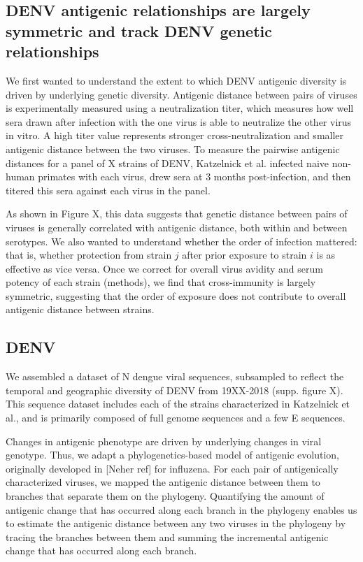 \documentclass[11pt,oneside,letterpaper]{article}
\begin{document}
\subsection*{DENV antigenic relationships are largely symmetric and track DENV genetic relationships}
We first wanted to understand the extent to which DENV antigenic diversity is driven by underlying genetic diversity.
Antigenic distance between pairs of viruses is experimentally measured using a neutralization titer, which measures how well sera drawn after infection with the one virus is able to neutralize the other virus in vitro.
A high titer value represents stronger cross-neutralization and smaller antigenic distance between the two viruses.
To measure the pairwise antigenic distances for a panel of X strains of DENV, Katzelnick et al. infected naive non-human primates with each virus, drew sera at 3 months post-infection, and then titered this sera against each virus in the panel.

As shown in Figure X, this data suggests that genetic distance between pairs of viruses is generally correlated with antigenic distance, both within and between serotypes.
We also wanted to understand whether the order of infection mattered: that is, whether protection from strain $j$ after prior exposure to strain $i$ is as effective as vice versa.
Once we correct for overall virus avidity and serum potency of each strain (methods), we find that cross-immunity is largely symmetric, suggesting that the order of exposure does not contribute to overall antigenic distance between strains.

\subsection*{DENV }


We assembled a dataset of N dengue viral sequences, subsampled to reflect the temporal and geographic diversity of DENV from 19XX-2018 (supp. figure X).
This sequence dataset includes each of the strains characterized in Katzelnick et al., and is primarily composed of full genome sequences and a few E sequences.

Changes in antigenic phenotype are driven by underlying changes in viral genotype.
Thus, we adapt a phylogenetics-based model of antigenic evolution, originally developed in [Neher ref] for influzena.
For each pair of antigenically characterized viruses, we mapped the antigenic distance between them to branches that separate them on the phylogeny.
Quantifying the amount of antigenic change that has occurred along each branch in the phylogeny enables us to estimate the antigenic distance between any two viruses in the phylogeny by tracing the branches between them and summing the incremental antigenic change that has occurred along each branch.
\end{document}
